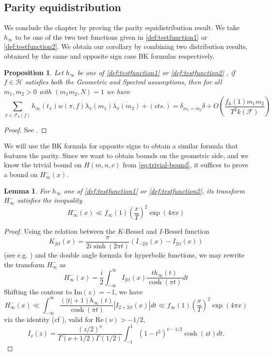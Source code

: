 \documentclass{article}
\newtheorem{lemma}[theorem]{Lemma}
\newtheorem{proposition}[theorem]{Proposition}
\numberwithin{equation}{section}
\begin{document}
\subsection{Parity equidistribution}\label{section:corollary}
We conclude the chapter by proving the parity equidistribution result. We take $h_\infty$ to be one of the two test functions given in \eqref{def:testfunction1} or \eqref{def:testfunction2}. We obtain our corollary by combining two distribution results, obtained by the same and opposite sign case BK formulas respectively.
\begin{proposition}\label{prop:positive-bound}
    Let $h_\infty$ be one of \eqref{def:testfunction1} or \eqref{def:testfunction2} , if $f \in \mathcal{H}$ satisfies both the Geometric and Spectral assumptions, then for all $m_1,m_2 >0$ with $(m_1m_2,N)=1$ we have
    \begin{equation}
        \sum_{\pi \in \mathcal{F}_0(f)}h_\infty(t_\pi)w(\pi,f)\lambda_{\pi}(m_1)\overline{\lambda_{\pi}(m_2)}+(cts.)=\delta_{m_1=m_2}\delta+O\left(\frac{f_{\mathbb{A}}(1)m_1m_2}{T^2k(\mathcal{F})}\right)
    \end{equation}
\end{proposition}
\begin{proof}
    See \cite[Lemma 1.13]{generalised}.
\end{proof}
We will use the BK formula for opposite signs to obtain a similar formula that features the parity. Since we want to obtain bounds on the geometric side, and we know the trivial bound on $H(m,n,c)$ from \eqref{eq:trivial-bound}, it suffices to prove a bound on $H_\infty^-(x)$.
\begin{lemma} \label{lemma:H-minus-bound}
For $h_\infty$ one of \eqref{def:testfunction1} or \eqref{def:testfunction2}, its transform $H_\infty^-$ satisfies the inequality
\begin{equation}
    H_\infty^-(x)\ll f_\infty(1)\left(\frac{x}{T} \right)^2\exp(4\pi x)
\end{equation}
\end{lemma}
\begin{proof}
    Using the relation between the $K$-Bessel and $I$-Bessel function
    \begin{equation*}
        K_{2it}(x)=\frac{\pi}{2i \sinh(2\pi t)}(I_{-2it}(x)-I_{2it}(x))
    \end{equation*}
    (see e.g. \cite[(B.34)]{Spectralmethods}) and the double angle formula for hyperbolic functions, we may rewrite the transform $H_\infty^-$ as
    \begin{equation}
        H_\infty^-(x)=\frac{i}{2}\int_{-\infty}^{\infty}I_{2it}(x)\frac{th_\infty(t)}{\cosh (\pi t)}dt
    \end{equation}
    Shifting the contour to $\text{Im}(z)=-1$, we have
    \begin{equation}
        H_\infty^-(x) \ll \int_{-\infty}^{\infty}\frac{(|t|+1)h_\infty (t)}{\cosh(\pi t)}|I_{2+2it}(x)|dt \ll f_\infty(1)\left(\frac{x}{T}\right)^2 \exp(4\pi x)
    \end{equation}
    via the identity (cf \cite[(8.431.2)]{Gradshteyn} ), valid for $\text{Re}(\nu)>-1/2$,
    $$I_\nu(z)=\frac{(z/2)^\nu}{\Gamma(\nu+1/2)\Gamma(1/2)}\int_{-1}^{1}(1-t^2)^{\nu-1/2}\cosh(zt)dt.$$
\end{proof}
\end{document}
